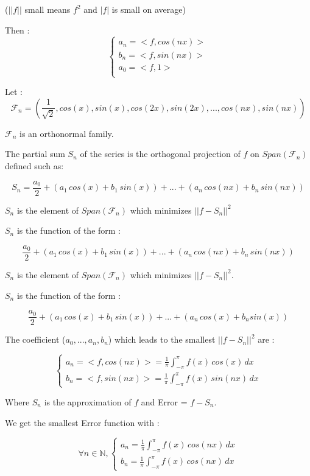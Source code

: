 \documentclass[a4paper,12pt]{article}
\begin{document}
($||f||$ small means $f^2$ and $|f|$ is small on average) \newline

Then : 
\[
\begin{cases}
    a_n = <f, cos(nx)> \\
    b_n = <f, sin(nx)> \\
    a_0 = <f, 1> \\
\end{cases}
\]

Let :
\[
\mathcal{F}_n = (\frac{1}{\sqrt{2}}, cos(x), sin(x), cos(2x), sin(2x), ..., cos(nx), sin(nx))
\]

$\mathcal{F}_n$ is an orthonormal family. \newline

The partial sum $S_n$ of the series is the orthogonal projection of $f$ on $Span(\mathcal{F}_n)$ defined such as:

\[
S_n = \frac{a_0}{2} + (a_1\,cos(x) + b_1\,sin(x)) + ... + (a_n\,cos(nx) + b_n\,sin(nx))
\]

$S_n$ is the element of $Span(\mathcal{F}_n)$ which minimizes $||f - S_n||^2$ \newline

$S_n$ is the function of the form :

\[
\frac{a_0}{2} + (a_1\,cos(x) + b_1\,sin(x)) + ... + (a_n\,cos(nx) + b_n\,sin(nx))
\]

$S_n$ is the element of $Span(\mathcal{F}_n)$ which minimizes $||f - S_n||^2$. \newline

$S_n$ is the function of the form :

\[
\frac{a_0}{2} + (a_1 \, cos(x) + b_1 \, sin(x)) + ... + (a_n \, cos(x) + b_n sin(x))
\]

The coefficient ($a_0, ..., a_n, b_n$) which leads to the smallest $||f - S_n||^2$ are : 

\[
\begin{cases}
    a_n = <f, cos(nx)> = \frac{1}{\pi}\int_{-\pi}^{\pi}{f(x)\,cos(x)\,dx} \\
    b_n = <f, sin(nx)> = \frac{1}{\pi}\int_{-\pi}^{\pi}{f(x)\,sin(nx)\,dx}
\end{cases}
\] \newline

Where $S_n$ is the approximation of $f$ and Error = $f - S_n$. \newline

We get the smallest Error function with :

\[
\forall n \in \mathbb{N}, \begin{cases}
a_n = \frac{1}{\pi}\int_{-\pi}^{\pi}{f(x)\,cos(nx)\,dx} \\
b_n = \frac{1}{\pi}\int_{-\pi}^{\pi}{f(x)\,cos(nx)\,dx}
\end{cases}
\]
\end{document}
